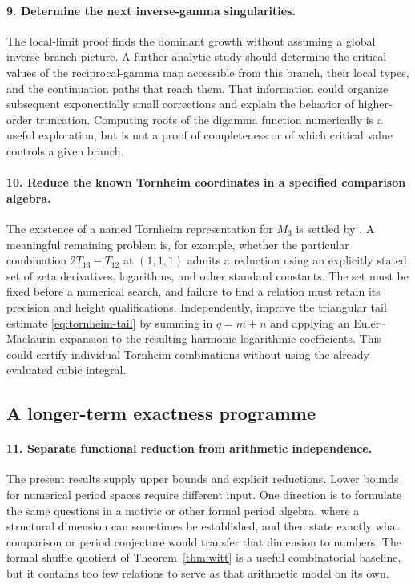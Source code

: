 \paragraph{9. Determine the next inverse-gamma singularities.}
The local-limit proof finds the dominant growth without assuming a
global inverse-branch picture. A further analytic study should determine
the critical values of the reciprocal-gamma map accessible from this
branch, their local types, and the continuation paths that reach them.
That information could organize subsequent exponentially small
corrections and explain the behavior of higher-order truncation.
Computing roots of the digamma function numerically is a useful
exploration, but is not a proof of completeness or of which critical
value controls a given branch.

\paragraph{10. Reduce the known Tornheim coordinates in a specified
comparison algebra.}
The existence of a named Tornheim representation for \(M_3\) is settled
by \cite{BBB}. A meaningful remaining problem is, for example, whether
the particular combination \(2T_{13}-T_{12}\) at \((1,1,1)\) admits
a reduction using an explicitly stated set of zeta derivatives,
logarithms, and other standard constants.
The set must be fixed before a numerical search, and failure to
find a relation must retain its precision and height qualifications.
Independently, improve the triangular tail estimate
\eqref{eq:tornheim-tail} by summing in \(q=m+n\) and applying
an Euler--Maclaurin expansion to the resulting harmonic-logarithmic
coefficients. This could certify individual Tornheim combinations
without using the already evaluated cubic integral.

\subsection{A longer-term exactness programme}

\paragraph{11. Separate functional reduction from arithmetic
independence.}
The present results supply upper bounds and explicit reductions.
Lower bounds for numerical period spaces require different input.
One direction is to formulate the same questions in a motivic or
other formal period algebra, where a structural dimension can
sometimes be established, and then state exactly what comparison
or period conjecture would transfer that dimension to numbers.
The formal shuffle quotient of Theorem~\ref{thm:witt} is a useful
combinatorial baseline, but it contains too few relations to serve
as that arithmetic model on its own.

